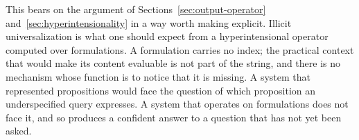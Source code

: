 This bears on the argument of Sections~\ref{sec:output-operator}
and~\ref{sec:hyperintensionality} in a way worth making explicit. Illicit
universalization is what one should expect from a hyperintensional operator
computed over formulations. A formulation carries no index; the practical context
that would make its content evaluable is not part of the string, and there is no
mechanism whose function is to notice that it is missing. A system that
represented propositions would face the question of which proposition an
underspecified query expresses. A system that operates on formulations does not
face it, and so produces a confident answer to a question that has not yet been
asked.
